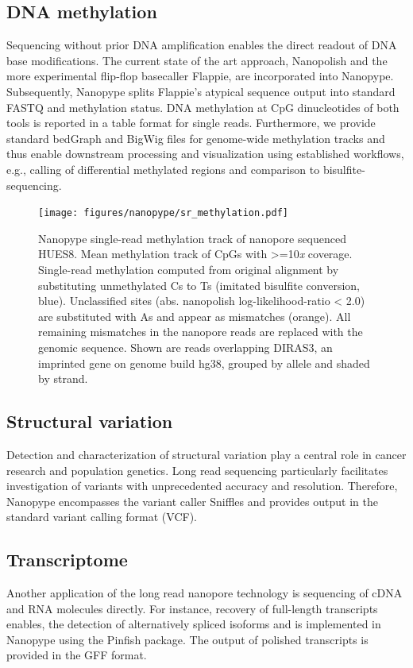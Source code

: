 \subsection{DNA methylation}
\label{subsec:nanopype:methylation}
Sequencing without prior DNA amplification enables the direct readout of DNA base modifications. The current state of the art approach, Nanopolish \cite{Simpson2017} and the more experimental flip-flop basecaller Flappie, are incorporated into Nanopype. Subsequently, Nanopype splits Flappie’s atypical sequence output into standard FASTQ and methylation status. DNA methylation at CpG dinucleotides of both tools is reported in a table format for single reads. Furthermore, we provide standard bedGraph and BigWig files for genome-wide methylation tracks and thus enable downstream processing and visualization using established workflows, e.g., calling of differential methylated regions and comparison to bisulfite-sequencing.

\begin{figure}[h]
	\centering
	\texttt{[image: figures/nanopype/sr\_methylation.pdf]}
	\captionsetup{format=plain}
	\caption[Nanopype single read methylation track]{Nanopype single-read methylation track of nanopore sequenced HUES8. Mean methylation track of CpGs with >=10\textit{x} coverage. Single-read methylation computed from original alignment by substituting unmethylated Cs to Ts (imitated bisulfite conversion, blue). Unclassified sites (abs. nanopolish log-likelihood-ratio < 2.0) are substituted with As and appear as mismatches (orange). All remaining mismatches in the nanopore reads are replaced with the genomic sequence. Shown are reads overlapping DIRAS3, an imprinted gene on genome build hg38, grouped by allele and shaded by strand.}
	\label{fig:nanopype:sr_methylation}
\end{figure}


\subsection{Structural variation}
\label{subsec:nanopype:sv}
Detection and characterization of structural variation play a central role in cancer research and population genetics. Long read sequencing particularly facilitates investigation of variants with unprecedented accuracy and resolution. Therefore, Nanopype encompasses the variant caller Sniffles \cite{Sedlazeck2018} and provides output in the standard variant calling format (VCF).


\subsection{Transcriptome}
\label{subsec:nanopype:transcriptom}
Another application of the long read nanopore technology is sequencing of cDNA and RNA molecules directly. For instance, recovery of full-length transcripts enables, the detection of alternatively spliced isoforms and is implemented in Nanopype using the Pinfish package. The output of polished transcripts is provided in the GFF format.

